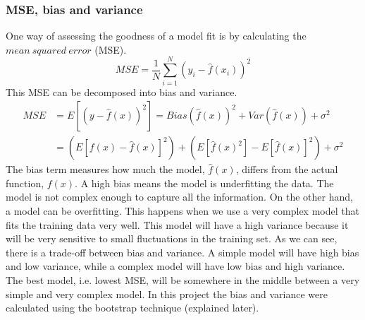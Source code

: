 \documentclass[12pt]{article}
\begin{document}
\subsubsection{MSE, bias and variance}
One way of assessing the goodness of a model fit is by calculating the $mean\ squared\ error$ (MSE).
\begin{equation}
MSE = \frac{1}{N}\sum_{i=1}^{N}(y_i-\hat{f}(x_i))^2
\label{eq:MSE}
\end{equation}
This MSE can be decomposed into bias and variance.
\begin{equation}
\begin{split}
MSE &= E[(y-\hat{f}(x))^2] = Bias(\hat{f}(x))^2 + Var(\hat{f}(x)) + \sigma^2\\
&= (E[f(x)-\hat{f}(x)]^2) + (E[\hat{f}(x)^2]-E[\hat{f}(x)]^2) + \sigma^2
\end{split}
\end{equation}
The bias term measures how much the model, $\hat{f}(x)$, differs from the actual function, $f(x)$. A high bias means the model is underfitting the data. The model is not complex enough to capture all the information. On the other hand, a model can be overfitting. This happens when we use a very complex model that fits the training data very well. This model will have a high variance because it will be very sensitive to small fluctuations in the training set. As we can see, there is a trade-off between bias and variance. A simple model will have high bias and low variance, while a complex model will have low bias and high variance. The best model, i.e. lowest MSE, will be somewhere in the middle between a very simple and very complex model. In this project the bias and variance were calculated using the bootstrap technique (explained later).
\end{document}
